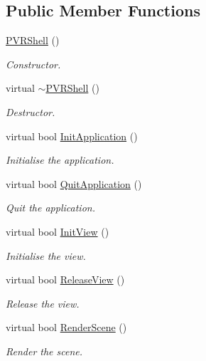 \subsection*{Public Member Functions}
\begin{DoxyCompactItemize}
\item 
\hyperlink{class_p_v_r_shell_a5394acd285326091371fcf1c97379878}{P\+V\+R\+Shell} ()
\begin{DoxyCompactList}\small\item\em Constructor. \end{DoxyCompactList}\item 
virtual \hyperlink{class_p_v_r_shell_a1c0ccdb2bdba4c041b197ffb40b9acf3}{$\sim$\+P\+V\+R\+Shell} ()
\begin{DoxyCompactList}\small\item\em Destructor. \end{DoxyCompactList}\item 
virtual bool \hyperlink{class_p_v_r_shell_a1ecb1d7021a3cc3f533acddc5ba8c1ce}{Init\+Application} ()
\begin{DoxyCompactList}\small\item\em Initialise the application. \end{DoxyCompactList}\item 
virtual bool \hyperlink{class_p_v_r_shell_adeebed7c8025a7270cee6f9609a97d68}{Quit\+Application} ()
\begin{DoxyCompactList}\small\item\em Quit the application. \end{DoxyCompactList}\item 
virtual bool \hyperlink{class_p_v_r_shell_ad1b978ddb9fb35b1d426818b756230fd}{Init\+View} ()
\begin{DoxyCompactList}\small\item\em Initialise the view. \end{DoxyCompactList}\item 
virtual bool \hyperlink{class_p_v_r_shell_a65a1e2efc768686903fd30c56218ed02}{Release\+View} ()
\begin{DoxyCompactList}\small\item\em Release the view. \end{DoxyCompactList}\item 
virtual bool \hyperlink{class_p_v_r_shell_ae0eb5f797cbe993a22b8659f9c332578}{Render\+Scene} ()
\begin{DoxyCompactList}\small\item\em Render the scene. \end{DoxyCompactList}\item 

\end{DoxyCompactItemize}
